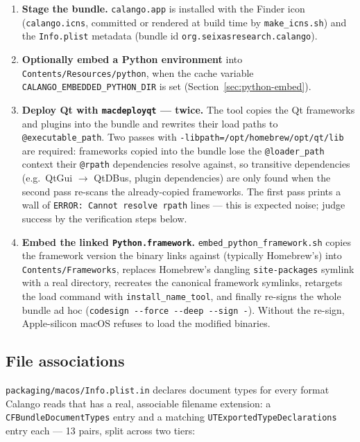 \documentclass[11pt,a4paper]{article}
\newcommand{\file}[1]{\texttt{#1}}
\newcommand{\opt}[1]{\texttt{#1}}
\begin{document}
\begin{enumerate}[itemsep=2pt]
  \item \textbf{Stage the bundle.} \file{calango.app} is installed with
        the Finder icon (\file{calango.icns}, committed or rendered at
        build time by \file{make\_icns.sh}) and the \file{Info.plist}
        metadata (bundle id \texttt{org.seixasresearch.calango}).
  \item \textbf{Optionally embed a Python environment} into
        \file{Contents/Resources/python}, when the cache variable
        \opt{CALANGO\_EMBEDDED\_PYTHON\_DIR} is set
        (Section~\ref{sec:python-embed}).
  \item \textbf{Deploy Qt with \file{macdeployqt} --- twice.} The tool
        copies the Qt frameworks and plugins into the bundle and rewrites
        their load paths to \texttt{@executable\_path}. Two passes with
        \opt{-libpath=/opt/homebrew/opt/qt/lib} are required: frameworks
        copied into the bundle lose the \texttt{@loader\_path} context
        their \texttt{@rpath} dependencies resolve against, so
        transitive dependencies (e.g.\ QtGui $\to$ QtDBus, plugin
        dependencies) are only found when the second pass re-scans the
        already-copied frameworks. The first pass prints a wall of
        \texttt{ERROR: Cannot resolve rpath} lines --- this is expected
        noise; judge success by the verification steps below.
  \item \textbf{Embed the linked \file{Python.framework}.}
        \file{embed\_python\_framework.sh} copies the framework version
        the binary links against (typically Homebrew's) into
        \file{Contents/Frameworks}, replaces Homebrew's dangling
        \file{site-packages} symlink with a real directory, recreates the
        canonical framework symlinks, retargets the load command with
        \file{install\_name\_tool}, and finally re-signs the whole bundle
        ad hoc (\lstinline|codesign --force --deep --sign -|). Without
        the re-sign, Apple-silicon macOS refuses to load the modified
        binaries.
\end{enumerate}

\subsection{File associations}
\label{sec:file-assoc}

\file{packaging/macos/Info.plist.in} declares document types for every
format Calango reads that has a real, associable filename extension: a
\opt{CFBundleDocumentTypes} entry and a matching
\opt{UTExportedTypeDeclarations} entry each --- 13 pairs, split across two
tiers:
\end{document}
